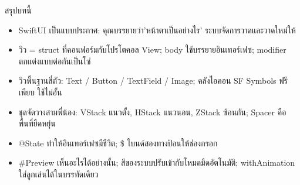 \begin{tcbsummary}{สรุปบทนี้}
\begin{itemize}
  \item SwiftUI เป็นแบบประกาศ: คุณบรรยายว่า'หน้าตาเป็นอย่างไร' ระบบจัดการวาดและวาดใหม่ให้
  \item วิว = struct ที่คอนฟอร์มกับโปรโตคอล View; body ใช้บรรยายอินเทอร์เฟซ; modifier ตกแต่งแบบต่อกันเป็นโซ่
  \item วิวพื้นฐานสี่ตัว: Text / Button / TextField / Image; คลังไอคอน SF Symbols ฟรีเพียบ ใช้ไม่อั้น
  \item ชุดจัดวางสามพี่น้อง: VStack แนวตั้ง, HStack แนวนอน, ZStack ซ้อนกัน; Spacer คือพื้นที่ยืดหยุ่น
  \item @State ทำให้อินเทอร์เฟซมีชีวิต; \$ ไบนด์สองทางป้อนให้ช่องกรอก
  \item \#Preview เห็นอะไรได้อย่างนั้น; สีของระบบปรับเข้ากับโหมดมืดอัตโนมัติ; withAnimation ใส่ลูกเล่นได้ในบรรทัดเดียว
\end{itemize}

\end{tcbsummary}
